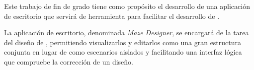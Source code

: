 Este trabajo de fin de grado tiene como propósito el desarrollo de una aplicación de escritorio que servirá de herramienta para facilitar el desarrollo de .

La aplicación de escritorio, denominada \textit{Maze Designer}, se encargará de la tarea del diseño de , permitiendo visualizarlos y editarlos como una gran estructura conjunta en lugar de como escenarios aislados y facilitando una interfaz lógica que compruebe la corrección de un diseño.